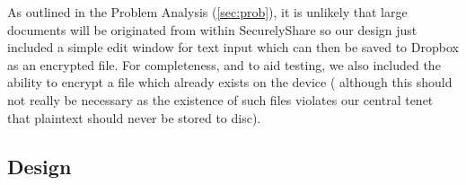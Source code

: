 As outlined in the Problem Analysis  (\ref{sec:prob}), it is unlikely that large documents will be originated from within SecurelyShare so our design just included a simple  edit window for text input which can then be saved to Dropbox as an encrypted file.  For completeness, and to aid testing, we also included the ability to encrypt a file which already exists on the device ( although this should not really be necessary as the existence of such files  violates our central tenet that plaintext should never be stored to disc). 

\subsection*{Design}




